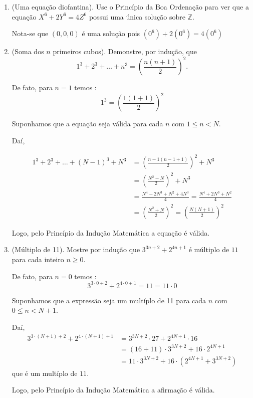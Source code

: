 \begin{enumerate}[label=1.\arabic*.]
\begin{enumerate}[label=\Roman*.]
    Em relação a $\sqrt{n}$ temos 3 possibilidades :

    1. $a > \sqrt{n}$ e $b > \sqrt{n}$ : o que seria uma contradição pois $a \cdot b > n$
    
    2. $a < \sqrt{n}$ e $b < \sqrt{n}$

    3. $a \geq \sqrt{n}$ e $b \leq \sqrt{n}$ (ou vice-versa)

    Assim, pelo menos um dos fatores deve ser \underline{menor ou igual} a $\sqrt{n}$, como $a,b > 1$ encontramos
    um divisor $d$ tal que $1 < d \leq \sqrt{n}$

\end{enumerate}

\item (Uma equação diofantina). Use o Princípio da Boa Ordenação para ver que a equação $X^6+2Y^6=4Z^6$ 
possui uma única solução sobre $\mathbb{Z}$.

Nota-se que $(0,0,0)$ é uma solução pois $(0^{6}) + 2(0^{6}) = 4(0^{6})$

\item (Soma dos $n$ primeiros cubos). Demonstre, por indução, que
\[
    1^3+2^3+\ldots+n^3=\left(\frac{n(n+1)}{2}\right)^2.
\]

De fato, para $ n = 1$ temos : 
\[
    1^{3} = \left(\frac{1(1+1)}{2}\right)^2
\]

Suponhamos que a equação seja válida para cada $n$ com $1 \leq n < N$.

Daí,

\begin{align*}
    1^3+2^3+\ldots+(N-1)^{3}+N^3 &= \left(\frac{n-1(n-1+1)}{2}\right)^2 + N^3 \\
    &= \left(\frac{N^2 - N}{2}\right)^2 + N^3 \\
    &= \frac{N^4 -2N^3 + N^2 + 4N^3}{4} = \frac{N^4 + 2N^3 + N^2}{4} \\
    &= \left(\frac{N^2 + N}{2}\right)^2= \left(\frac{N(N+1)}{2}\right)^2
\end{align*}

Logo, pelo Princípio da Indução Matemática a equação é válida.

\item (Múltiplo de 11). Mostre por indução que $3^{3n+2}+2^{4n+1}$ é múltiplo de $11$ para 
cada inteiro $n\ge 0$.

    De fato, para $ n = 0$ temos : 
\[
    3^{3 \cdot 0 + 2 }+ 2^{4 \cdot 0 + 1} = 11 = 11 \cdot 0  
\]

Suponhamos que a expressão seja um multíplo de 11 para cada $n$ com $0 \leq n < N + 1$.

Daí,    
\begin{align*}
    3^{3 \cdot (N+1) + 2 } + 2^{4 \cdot (N+1) + 1} &= 3^{3N + 2 } \cdot 27 + 2^{4N + 1} \cdot 16 \\
    &= (16 + 11) \cdot 3^{3N + 2} + 16 \cdot 2^{4N + 1} \\
    &= 11 \cdot 3^{3N + 2} + 16 \cdot (2^{4N + 1} + 3^{3N + 2})
\end{align*}
que é um multíplo de $11$.

Logo, pelo Princípio da Indução Matemática a afirmação é válida.

\end{enumerate}
